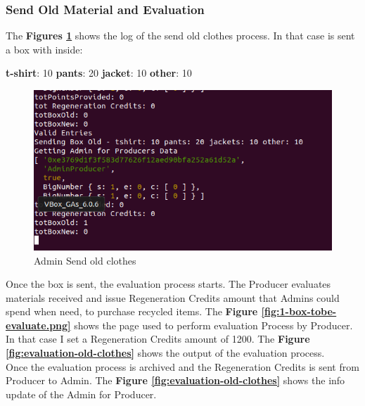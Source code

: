 \subsubsection{Send Old Material and Evaluation}

The \textbf{Figures \ref{fig:send-old-clothes}} shows the log of the send old clothes process.
In that case is sent a box with inside: 
\begin{outline}
    \1 \textbf{t-shirt}: 10
    \1 \textbf{pants}: 20
    \1 \textbf{jacket}: 10
    \1 \textbf{other}: 10
\end{outline}

\begin{figure}[h!]
	\centering
    \includegraphics[totalheight=6cm]{img/test/usecase2/0-send-old-clothes.png}
	\caption{Admin Send old clothes}
	\label{fig:send-old-clothes}
\end{figure}

Once the box is sent, the evaluation process starts. The Producer evaluates materials received
and issue Regeneration Credits amount that Admins could spend when need, to purchase
recycled items. The \textbf{Figure \ref{fig:1-box-tobe-evaluate.png}} shows the page used
to perform evaluation Process by Producer. In that case I set a Regeneration Credits amount
of 1200. The \textbf{Figure \ref{fig:evaluation-old-clothes}} shows the output of the evaluation process.
\\
Once the evaluation process is archived and the Regeneration Credits is sent
from Producer to Admin. The \textbf{Figure \ref{fig:evaluation-old-clothes}} shows the info update
of the Admin for Producer.

